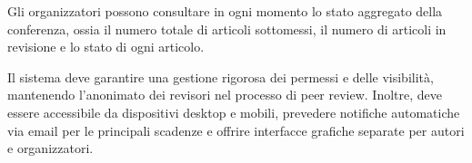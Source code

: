 Gli organizzatori possono consultare in ogni momento lo stato
aggregato della conferenza, ossia il numero totale di articoli
sottomessi, il numero di articoli in revisione e lo stato di ogni
articolo.
\bigskip

Il sistema deve garantire una gestione rigorosa dei permessi e delle
visibilità, mantenendo l’anonimato dei revisori nel processo di peer
review. Inoltre, deve essere accessibile da dispositivi desktop e
mobili, prevedere notifiche automatiche via email per le principali
scadenze e offrire interfacce grafiche separate per autori e
organizzatori.

